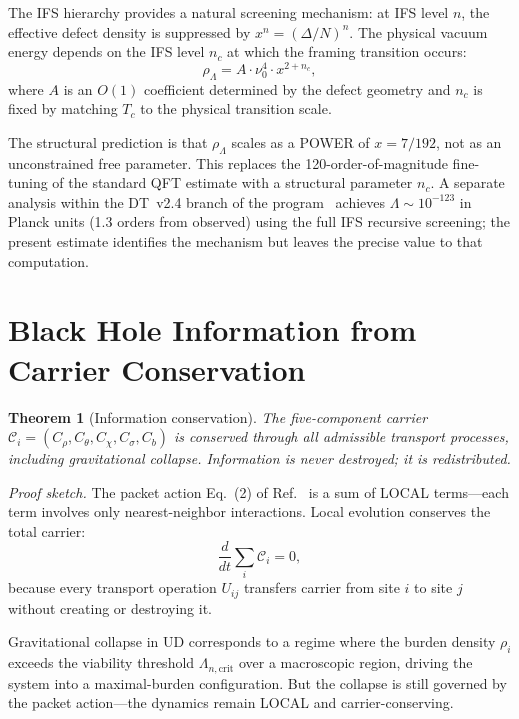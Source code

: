 \documentclass[11pt,twocolumn]{article}
\newtheorem{theorem}{Theorem}
\begin{document}
The IFS hierarchy provides a natural screening mechanism: at IFS level $n$, the effective defect density is suppressed by $x^n=(\Delta/N)^n$.
The physical vacuum energy depends on the IFS level $n_c$ at which the framing transition occurs:
\begin{equation}
\rho_\Lambda = A\cdot\nu_0^4\cdot x^{2+n_c},
\end{equation}
where $A$ is an $O(1)$ coefficient determined by the defect geometry and $n_c$ is fixed by matching $T_c$ to the physical transition scale.

The structural prediction is that $\rho_\Lambda$ scales as a POWER of $x=7/192$, not as an unconstrained free parameter.
This replaces the 120-order-of-magnitude fine-tuning of the standard QFT estimate with a structural parameter $n_c$.
A separate analysis within the DT~v2.4 branch of the program~\cite{mayes2026ud} achieves $\Lambda\sim 10^{-123}$ in Planck units (1.3 orders from observed) using the full IFS recursive screening; the present estimate identifies the mechanism but leaves the precise value to that computation.

\section{Black Hole Information from Carrier Conservation}
\label{sec:bh}

\begin{theorem}[Information conservation]
\label{thm:info}
The five-component carrier $\mathcal{C}_i=(C_\rho,C_\theta,C_\chi,C_\sigma,C_b)$ is conserved through all admissible transport processes, including gravitational collapse.
Information is never destroyed; it is redistributed.
\end{theorem}

\textit{Proof sketch.}
The packet action Eq.~(2) of Ref.~\cite{mayes2026ud} is a sum of LOCAL terms---each term involves only nearest-neighbor interactions.
Local evolution conserves the total carrier:
\begin{equation}
\frac{d}{dt}\sum_i\mathcal{C}_i = 0,
\end{equation}
because every transport operation $U_{ij}$ transfers carrier from site $i$ to site $j$ without creating or destroying it.

Gravitational collapse in UD corresponds to a regime where the burden density $\rho_i$ exceeds the viability threshold $\Lambda_{n,\mathrm{crit}}$ over a macroscopic region, driving the system into a maximal-burden configuration.
But the collapse is still governed by the packet action---the dynamics remain LOCAL and carrier-conserving.
\end{document}
